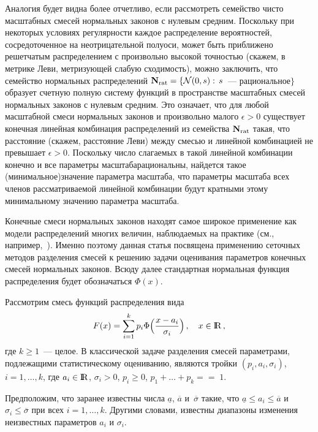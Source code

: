 \begin{multicols}{2}
Аналогия будет видна более отчетливо, если рассмотреть семейство
чисто масштабных смесей нормальных законов с нулевым средним.
Поскольку при некоторых условиях регулярности каж\-дое распределение
вероятностей, сосредоточенное на неотрицательной полуоси, может
быть приближено решетчатым распределением с произвольно высокой
точностью (скажем, в метрике Леви, метризующей слабую сходимость),
можно\linebreak
заключить, что семейство нормальных распределений ${\bf
N}_{\mathrm{rat}}=\{\mathcal{N}(0,s):\,s$~--- рациональное$\}$
образует счетную полную систему функций в пространстве масштабных
смесей нормальных законов с нулевым средним. Это означает, что для любой
масштабной смеси нормальных законов и произвольно малого
$\epsilon>0$ существует конечная линейная комбинация распределений
из семейства ${\bf N}_{\mathrm{rat}}$ такая, что рас\-стояние
(скажем, расстояние Леви) между смесью и линейной комбинацией не
превышает $\epsilon>0$. Поскольку число слагаемых в такой линейной
комбинации конечно и все па\-ра\-мет\-ры масштаба\linebreak рациональны, найдется
такое (минимальное)\linebreak значение па\-ра\-мет\-ра масштаба, что параметры
масштаба всех членов рассматриваемой линейной комбинации будут
кратными этому минимальному значению па\-ра\-мет\-ра масштаба.

Конечные смеси нормальных законов находят самое широкое применение
как модели распределений многих величин, наблюдаемых на практике
(см., например,~\cite{2k}). Именно поэтому данная статья посвящена
применению сеточных методов разделения смесей к решению задачи
оценивания параметров конечных смесей нормальных законов. Всюду
далее стандартная нормальная функция распределения будет
обозначаться $\Phi(x)$.

Рассмотрим смесь функций распределения вида
\begin{equation}
F(x)=\sum_{i=1}^kp_i\Phi\Big(\displaystyle\frac{\displaystyle x-a_i\mathstrut}{\displaystyle \sigma_i\mathstrut}\Big)\,,\quad
x\in\rm I\hspace{-0.7mm}\rm R\,,
\label{e1k}
\end{equation}
где $k\ge 1$~--- целое. В классической задаче
разделения смесей параметрами, подлежащими статистическому
оцениванию, являются тройки $(p_i, a_i, \sigma_i)$,
$i=1,\ldots,k$, где $a_i\in\rm I\hspace{-0.7mm}\rm R$, $\sigma_i>0$, $p_i\ge 0$,
$p_1+\ldots+p_k=$\linebreak $=\;1$.

Предположим, что заранее известны числа $\underline a$, $\overline
a$ и~$\overline\sigma$ такие, что $\underline a\le a_i\le\overline
a$ и $\sigma_i\le\overline\sigma$ при всех $i=1,\ldots,k$. Другими
словами, известны диапазоны изменения неизвестных параметров $a_i$
и $\sigma_i$.


\end{multicols}
